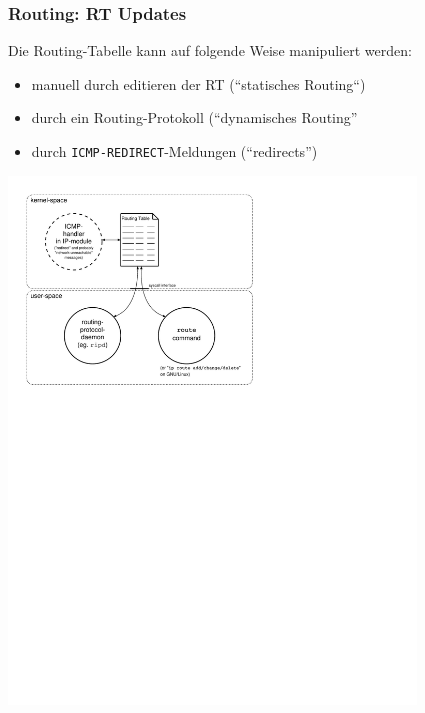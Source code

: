 \documentclass[ignorenonframetext]{beamer}
\begin{document}
\begin{frame}
\frametitle{Routing: RT Updates}
Die Routing-Tabelle kann auf folgende Weise manipuliert werden:
\begin{itemize}
	\item{manuell durch editieren der RT (``statisches Routing``)}
	\item{durch ein Routing-Protokoll (``dynamisches Routing''}
	\item{durch \texttt{ICMP-REDIRECT}-Meldungen (``redirects'')}
\end{itemize}
\begin{center}
	\includegraphics[height=14cm]{routing-rt-manipulation}
\end{center}
\end{frame}
\end{document}
